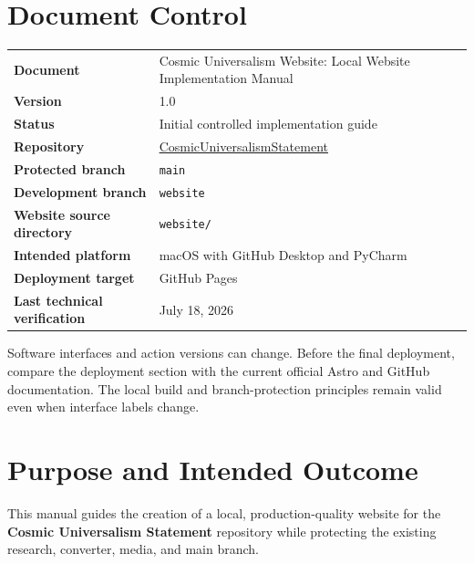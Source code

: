 \documentclass[11pt,letterpaper]{article}
\newcommand{\ProjectTitle}{Cosmic Universalism Website}
\newcommand{\DocumentTitle}{Local Website Implementation Manual}
\newcommand{\RepositoryName}{CosmicUniversalismStatement}
\newcommand{\RepositoryURL}{https://github.com/willmaddock/CosmicUniversalismStatement}
\newcommand{\WebsiteBranch}{website}
\newcommand{\WebsiteDirectory}{website/}
\newcommand{\DocumentVersion}{1.0}
\newcommand{\VerificationDate}{July 18, 2026}
\newcommand{\filepath}[1]{\texttt{#1}}
\newcommand{\branchname}[1]{\texttt{#1}}
\begin{document}
\pagecolor{white}
\color{CUText}

\section*{Document Control}

\begin{tabularx}{\textwidth}{>{\bfseries}L{1.8in}Y}
\toprule
Document & \ProjectTitle: \DocumentTitle \\
Version & \DocumentVersion \\
Status & Initial controlled implementation guide \\
Repository & \href{\RepositoryURL}{\RepositoryName} \\
Protected branch & \branchname{main} \\
Development branch & \branchname{\WebsiteBranch} \\
Website source directory & \filepath{\WebsiteDirectory} \\
Intended platform & macOS with GitHub Desktop and PyCharm \\
Deployment target & GitHub Pages \\
Last technical verification & \VerificationDate \\
\bottomrule
\end{tabularx}

\begin{notebox}
Software interfaces and action versions can change. Before the final
deployment, compare the deployment section with the current official
Astro and GitHub documentation. The local build and branch-protection
principles remain valid even when interface labels change.
\end{notebox}

\clearpage
\tableofcontents
\clearpage

\section{Purpose and Intended Outcome}

\begin{purposebox}
This manual guides the creation of a local, production-quality website
for the \textbf{Cosmic Universalism Statement} repository while
protecting the existing research, converter, media, and main branch.
\end{purposebox}
\end{document}

